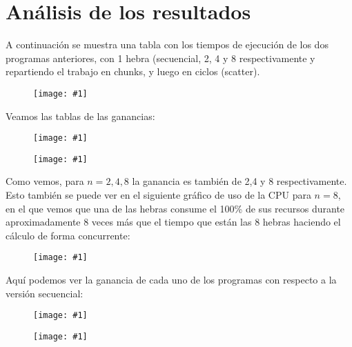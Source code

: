 \documentclass[a4paper, 11pt]{article}
\newcommand{\imageins}[4]{\begin{figure}[!ht]		%
    \centering
    \texttt{[image: \#1]}
    \vspace{0.2em}
\end{figure}}
\begin{document}
\section*{Análisis de los resultados}

A continuación se muestra una tabla con los tiempos de ejecución de los dos programas anteriores, con 1 hebra (secuencial, 2, 4 y 8 respectivamente y repartiendo el trabajo en chunks, y luego en ciclos (scatter).

\imageins{./images/timetable.png}{1}{}{}

Veamos las tablas de las ganancias:

\imageins{./images/chunk_s.png}{0.8}{}{}
\imageins{./images/scatter_s.png}{0.8}{}{}

Como vemos, para $n=2,4,8$ la ganancia es también de 2,4 y 8 respectivamente. Esto también se puede ver en el siguiente gráfico de uso de la CPU para $n=8$, en el que vemos que una de las hebras consume el 100\% de sus recursos durante aproximadamente 8 veces más que el tiempo que están las 8 hebras haciendo el cálculo de forma concurrente:

\imageins{./images/cpu_usage.png}{1}{}{}

\newpage

Aquí podemos ver la ganancia de cada uno de los programas con respecto a la versión secuencial: 

\imageins{./images/chunk_g.png}{0.8}{}{}
\imageins{./images/scatter_g.png}{0.8}{}{}
\end{document}
